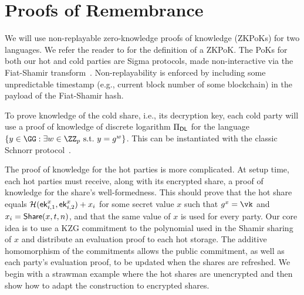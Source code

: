 \section{Proofs of Remembrance}\label{sec:hotproofs}


We will use non-replayable zero-knowledge proofs of knowledge (ZKPoKs) for two languages. We refer the reader to \cite{Thaler23} for the definition of a ZKPoK. The PoKs for both our hot and cold parties are Sigma protocols, made non-interactive via the Fiat-Shamir transform~\cite{C:FiaSha86}. Non-replayability is enforced by including some unpredictable timestamp (e.g., current block number of some blockchain) in the payload of the Fiat-Shamir hash.


To prove knowledge of the cold share, i.e., its decryption key, each cold party will use a proof of knowledge of discrete logarithm $\Pi_{\sf DL}$ for the language $\{y \in \GG : \exists \witness \in \ZZ_p \suchthat y = g^\witness \}$. This can be instantiated with the classic Schnorr protocol~\cite{C:Schnorr89}.

The proof of knowledge for the hot parties is more complicated. At setup time, each hot parties must receive, along with its encrypted share, a proof of knowledge for the share's well-formedness. This should prove that the hot share equals $\mathcal{H}(\mathsf{ek}_{i,1}^x, \mathsf{ek}_{i,2}^x)+x_i$ for some secret value $x$ such that $g^x = \vk$ and $x_i = \mathsf{Share}(x,t,n)$, and that the same value of $x$ is used for every party. 
Our core idea is to use a KZG commitment to the polynomial used in the Shamir sharing of $x$ and distribute an evaluation proof to each hot storage. The additive homomorphism of the commitments allows the public commitment, as well as each party's evaluation proof, to be updated when the shares are refreshed. 
We begin with a strawman example where the hot shares are unencrypted and then show how to adapt the construction to encrypted shares.

